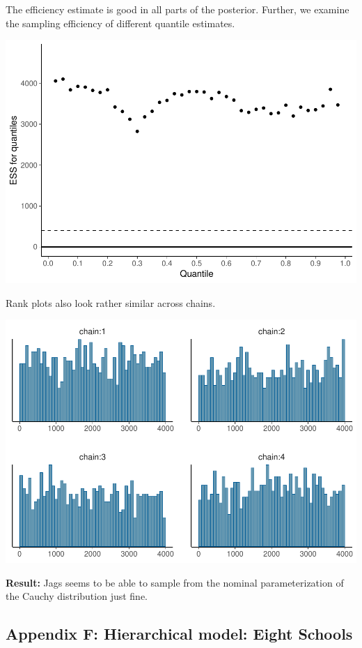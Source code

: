 \documentclass[american,]{article}
\begin{document}
The efficiency estimate is good in all parts of the posterior. Further,
we examine the sampling efficiency of different quantile estimates.

\includegraphics{graphics/quantile-ess-jags-nom-1.pdf}

Rank plots also look rather similar across chains.

\includegraphics{graphics/hist-jags-nom-1.pdf}

\textbf{Result:} Jags seems to be able to sample from the nominal
parameterization of the Cauchy distribution just fine.

\hypertarget{AppendixF}{%
\subsection*{Appendix F: Hierarchical model: Eight
Schools}\label{AppendixF}}
\end{document}
